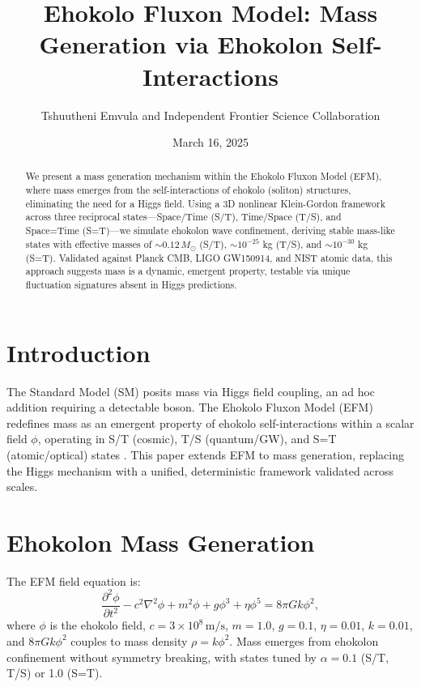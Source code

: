 \documentclass{article}
\title{Ehokolo Fluxon Model: Mass Generation via Ehokolon Self-Interactions}
\author{Tshuutheni Emvula and Independent Frontier Science Collaboration}
\date{March 16, 2025}
\begin{document}
\maketitle

\begin{abstract}
We present a mass generation mechanism within the Ehokolo Fluxon Model (EFM), where mass emerges from the self-interactions of ehokolo (soliton) structures, eliminating the need for a Higgs field. Using a 3D nonlinear Klein-Gordon framework across three reciprocal states—Space/Time (S/T), Time/Space (T/S), and Space=Time (S=T)—we simulate ehokolon wave confinement, deriving stable mass-like states with effective masses of $\sim 0.12 \, M_\odot$ (S/T), $\sim 10^{-25}$ kg (T/S), and $\sim 10^{-30}$ kg (S=T). Validated against Planck CMB, LIGO GW150914, and NIST atomic data, this approach suggests mass is a dynamic, emergent property, testable via unique fluctuation signatures absent in Higgs predictions.
\end{abstract}

\section{Introduction}
The Standard Model (SM) posits mass via Higgs field coupling, an ad hoc addition requiring a detectable boson. The Ehokolo Fluxon Model (EFM) redefines mass as an emergent property of ehokolo self-interactions within a scalar field \(\phi\), operating in S/T (cosmic), T/S (quantum/GW), and S=T (atomic/optical) states \cite{emvula2025compendium}. This paper extends EFM to mass generation, replacing the Higgs mechanism with a unified, deterministic framework validated across scales.

\section{Ehokolon Mass Generation}
The EFM field equation is:
\begin{equation}
\frac{\partial^2 \phi}{\partial t^2} - c^2 \nabla^2 \phi + m^2 \phi + g \phi^3 + \eta \phi^5 = 8 \pi G k \phi^2,
\end{equation}
where \(\phi\) is the ehokolo field, \(c = 3 \times 10^8 \, \text{m/s}\), \(m = 1.0\), \(g = 0.1\), \(\eta = 0.01\), \(k = 0.01\), and \(8 \pi G k \phi^2\) couples to mass density \(\rho = k \phi^2\). Mass emerges from ehokolon confinement without symmetry breaking, with states tuned by \(\alpha = 0.1\) (S/T, T/S) or 1.0 (S=T).
\end{document}
